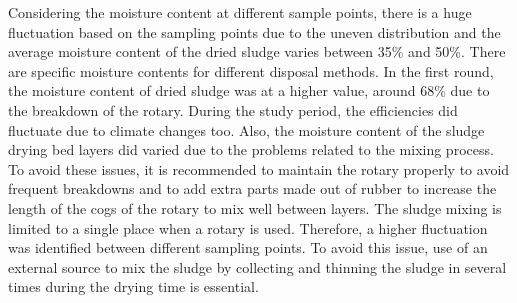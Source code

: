 Considering the moisture content at different sample points, there is a huge fluctuation based on the sampling points due to the uneven distribution and the average moisture content of the dried sludge varies between 35\% and 50\%. There are specific moisture contents for different disposal methods. In the first round, the moisture content of dried sludge was at a higher value, around 68\% due to the breakdown of the rotary. During the study period, the efficiencies did fluctuate due to climate changes too. Also, the moisture content of the sludge drying bed layers did varied due to the problems related to the mixing process. To avoid these issues, it is recommended to maintain the rotary properly to avoid frequent breakdowns and to add extra parts made out of rubber to increase the length of the cogs of the rotary to mix well between layers. The sludge mixing is limited to a single place when a rotary is used. Therefore, a higher fluctuation was identified between different sampling points. To avoid this issue, use of an external source to mix the sludge by collecting and thinning the sludge in several times during the drying time is essential. 